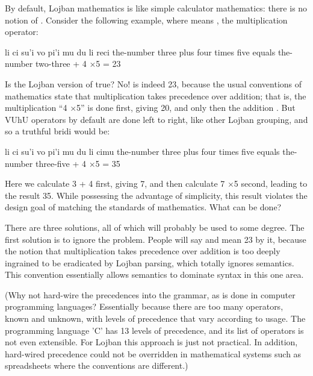 By default, Lojban mathematics is like simple calculator
    mathematics: there is no notion of .
    Consider the following example, where  means ,
    the multiplication operator:
\begin{example}
li ci su'i vo pi'i mu\n
\T	du li reci\n
the-number three plus four times five\n
\T	equals the-number two-three + 4 $\times$5 = 23
\end{example}

Is the Lojban version of 
    true? No!  is indeed 23, because the usual
    conventions of mathematics state that multiplication takes
    precedence over addition; that is, the multiplication ``4
    $\times$5'' is done first, giving 20, and only then the
    addition . But VUhU operators by default are done
    left to right, like other Lojban grouping, and so a truthful
    bridi would be:
\begin{example}
li ci su'i vo pi'i mu\n
\T	du li cimu\n
the-number three plus four times five\n
\T	equals the-number three-five + 4 $\times$5 = 35
\end{example}

Here we calculate 3 + 4 first, giving 7, and then calculate 7
    $\times$5 second, leading to the result 35. While possessing
    the advantage of simplicity, this result violates the design
    goal of matching the standards of mathematics. What can be
    done? 

There are three solutions, all of which will probably be
    used to some degree. The first solution is to ignore the
    problem. People will say  and mean 23
    by it, because the notion that multiplication takes precedence
    over addition is too deeply ingrained to be eradicated by
    Lojban parsing, which totally ignores semantics. This
    convention essentially allows semantics to dominate syntax in
    this one area.

(Why not hard-wire the precedences into the grammar, as is
    done in computer programming languages? Essentially because
    there are too many operators, known and unknown, with levels of
    precedence that vary according to usage. The programming
    language 'C' has 13 levels of precedence, and its list of
    operators is not even extensible. For Lojban this approach is
    just not practical. In addition, hard-wired precedence could
    not be overridden in mathematical systems such as spreadsheets
    where the conventions are different.)


